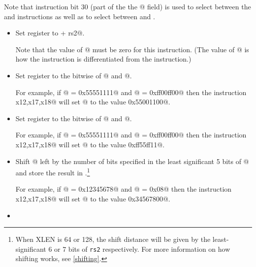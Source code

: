 Note that instruction bit 30 (part of the the @ field)
is used to select between the \verb@add@ and \verb@sub@ instructions
as well as to select between \verb@srl@ and \verb@sra@.

\begin{itemize}
\item{}
\label{insn:add}

Set register \verb@rd@ to  + rs2@.

Note that the value of @ must be zero for this instruction.
(The value of @ is how the \verb@add@ instruction is differentiated
from the \verb@sub@ instruction.)

\item{}
\label{insn:and}

Set register \verb@rd@ to the bitwise \verb@and@ of @ and  @.

For example, if @ = \verb@0x55551111@ and @ = \verb@0xff00ff00@
then the instruction \verb@and x12,x17,x18@ will set @ to the
value \verb@0x55001100@.

\item{}
\label{insn:or}

Set register \verb@rd@ to the bitwise \verb@or@ of @ and  @.

For example, if @ = \verb@0x55551111@ and @ = \verb@0xff00ff00@
then the instruction \verb@or x12,x17,x18@ will set @ to the
value \verb@0xff55ff11@.

\item{}
\label{insn:sll}

Shift @ left by the number of bits specified in the least significant
5 bits of @ and store the result in \verb@rd@.\footnote{\label{shift:xlen}
When XLEN is 64 or 128, the shift distance will be given by the least-significant
6 or 7 bits of \texttt{rs2} respectively.
For more information on how shifting works, see \autoref{shifting}.}

For example, if @ = \verb@0x12345678@ and @ = \verb@0x08@
then the instruction \verb@sll x12,x17,x18@ will set @ to the
value \verb@0x34567800@.

\item{}
\label{insn:slt}


\end{itemize}
